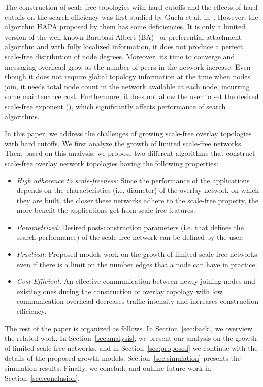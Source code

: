 \documentclass[10pt,journal,cspaper,compsoc]{IEEEtran}
\begin{document}
The construction of scale-free topologies with hard cutoffs and the effects of hard cutoffs on the search efficiency was first studied by Guclu et al. in~\cite{guclu}. However, the algorithm HAPA proposed by them has some deficiencies.
It is only a limited version of the well-known Barabasi-Albert (BA)~\cite{ba} or preferential attachment algorithm and with fully localized information, it
does not produce a perfect scale-free distribution of node degrees. Moreover, its time to converge and messaging overhead grow as the number of peers in the network increase. Even though it does not require global topology information at the time when nodes join, it needs total node count in the network available at each node, 
incurring some maintenance cost. Furthermore, it does not allow the user to set the desired scale-free exponent (), which significantly affects performance of search algorithms. 

In this paper, we address the challenges of growing scale-free overlay topologies with hard cutoffs. We first analyze the growth of limited scale-free networks. Then, based on this analysis, we propose two different algorithms that construct scale-free overlay network topologies having the following properties:
\begin{itemize}
\item{\it High adherence to scale-freeness:} Since the performance of the applications depends on the characteristics (i.e. diameter) of the overlay network on which they are built, the closer these networks adhere to the scale-free property, the more benefit the applications get from scale-free features.
\item{\it Parametrized:} Desired post-construction parameters (i.e.  that defines the search performance) of the scale-free network can be defined by the user.
\item{\it Practical:} Proposed models work on the growth of limited scale-free networks even if there is a limit on the number edges that a node can have in practice.
\item{\it Cost-Efficient:} An effective communication between newly joining nodes and existing ones during the construction of overlay topology with low communication overhead decreases traffic intensity and increases construction efficiency.
\end{itemize}

The rest of the paper is organized as follows. In Section~\ref{sec:back}, we overview the related work. In Section~\ref{sec:analysis}, we present our analysis on the growth of limited scale-free networks, and in Section~\ref{sec:proposed} we continue with the details of the proposed growth models. 
Section~\ref{sec:simulation} presents the simulation results. Finally, we conclude and outline future work in Section~\ref{sec:conclusion}.
\end{document}
